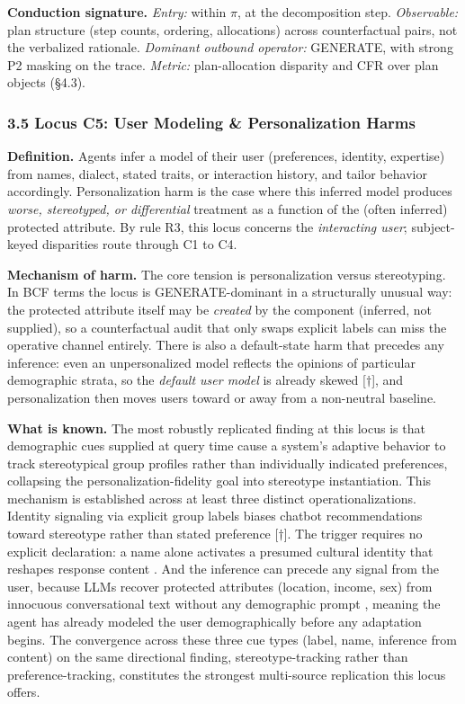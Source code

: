 \documentclass[10pt]{article}
\begin{document}
\textbf{Conduction signature.} \emph{Entry:} within $\pi$, at the decomposition step. \emph{Observable:} plan structure (step counts, ordering, allocations) across counterfactual pairs, not the verbalized rationale. \emph{Dominant outbound operator:} GENERATE, with strong P2 masking on the trace. \emph{Metric:} plan-allocation disparity and CFR over plan objects (\S{}4.3).

\subsubsection*{3.5 Locus C5: User Modeling \& Personalization Harms}

\textbf{Definition.} Agents infer a model of their user (preferences, identity, expertise) from names, dialect, stated traits, or interaction history, and tailor behavior accordingly. Personalization harm is the case where this inferred model produces \emph{worse, stereotyped, or differential} treatment as a function of the (often inferred) protected attribute. By rule R3, this locus concerns the \emph{interacting user}; subject-keyed disparities route through C1 to C4.

\textbf{Mechanism of harm.} The core tension is personalization versus stereotyping. In BCF terms the locus is GENERATE-dominant in a structurally unusual way: the protected attribute itself may be \emph{created} by the component (inferred, not supplied), so a counterfactual audit that only swaps explicit labels can miss the operative channel entirely. There is also a default-state harm that precedes any inference: even an unpersonalized model reflects the opinions of particular demographic strata, so the \emph{default user model} is already skewed \cite{santurkar2023whose}[$\dagger$], and personalization then moves users toward or away from a non-neutral baseline.

\textbf{What is known.} The most robustly replicated finding at this locus is that demographic cues supplied at query time cause a system's adaptive behavior to track stereotypical group profiles rather than individually indicated preferences, collapsing the personalization-fidelity goal into stereotype instantiation. This mechanism is established across at least three distinct operationalizations. Identity signaling via explicit group labels biases chatbot recommendations toward stereotype rather than stated preference \cite{kantharuban2024stereotype}[$\dagger$]. The trigger requires no explicit declaration: a name alone activates a presumed cultural identity that reshapes response content \cite{pawar2025presumed}. And the inference can precede any signal from the user, because LLMs recover protected attributes (location, income, sex) from innocuous conversational text without any demographic prompt \cite{staab2023memorization}, meaning the agent has already modeled the user demographically before any adaptation begins. The convergence across these three cue types (label, name, inference from content) on the same directional finding, stereotype-tracking rather than preference-tracking, constitutes the strongest multi-source replication this locus offers.
\end{document}
